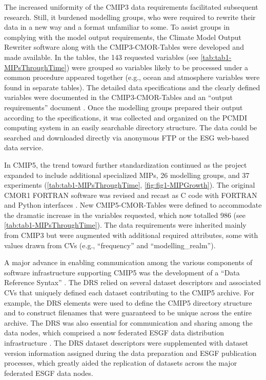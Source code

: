 \documentclass[manuscript]{copernicus}
\begin{document}
The increased uniformity of the CMIP3 data requirements facilitated subsequent research. Still, it burdened modelling groups, who were required to rewrite their data in a new way and a format unfamiliar to some. To assist groups in complying with the model output requirements, the Climate Model Output Rewriter software \citep[CMOR1;][]{taylor_cmor_2006} along with the CMIP3-CMOR-Tables \citep{doutriaux_cmip3_2005} were developed and made available. In the tables, the 143 requested variables (see \autoref{tab:tab1-MIPsThroughTime}) were grouped so variables likely to be processed under a common procedure appeared together (e.g., ocean and atmosphere variables were found in separate tables). The detailed data specifications and the clearly defined variables were documented in the CMIP3-CMOR-Tables and an ``output requirements'' document \citep{taylor_pcmdi_2005}. Once the modelling groups prepared their output according to the specifications, it was collected and organized on the PCMDI computing system in an easily searchable directory structure. The data could be searched and downloaded directly via anonymous FTP or the ESG web-based data service.

In CMIP5, the trend toward further standardization continued as the project expanded to include additional specialized MIPs, 26 modelling groups, and 37 experiments (\autoref{tab:tab1-MIPsThroughTime}, \autoref{fig:fig1-MIPGrowth}). The original CMOR1 FORTRAN software was revised and recast as C code with FORTRAN and Python interfaces \citep{doutriaux_cmor_2011}. New CMIP5-CMOR-Tables \citep{doutriaux_cmip5_2013} were defined to accommodate the dramatic increase in the variables requested, which now totalled 986 (see \autoref{tab:tab1-MIPsThroughTime}). The data requirements were inherited mainly from CMIP3 but were augmented with additional required attributes, some with values drawn from CVs (e.g., ``frequency'' and ``modelling\_realm'').

A major advance in enabling communication among the various components of software infrastructure supporting CMIP5 was the development of a ``Data Reference Syntax'' \citep[DRS;][]{taylor_pcmdi_2012}. The DRS relied on several dataset descriptors and associated CVs that uniquely defined each dataset contributing to the CMIP5 archive. For example, the DRS elements were used to define the CMIP5 directory structure and to construct filenames that were guaranteed to be unique across the entire archive. The DRS was also essential for communication and sharing among the data nodes, which comprised a now federated ESGF data distribution infrastructure \citep[\autoref{sec:earthSystemGridFederation};][]{williams_earth_2011}. The DRS dataset descriptors were supplemented with dataset version information assigned during the data preparation and ESGF publication processes, which greatly aided the replication of datasets across the major federated ESGF data nodes.
\end{document}
